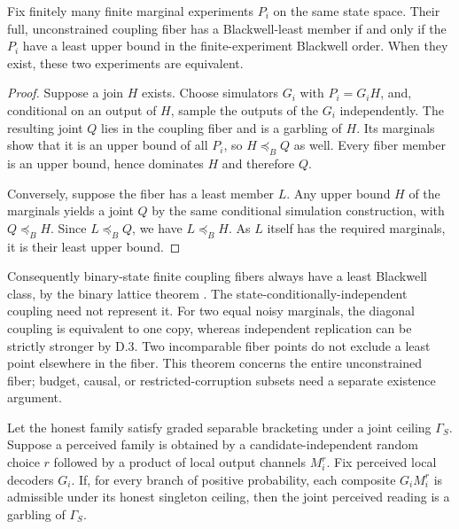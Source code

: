 
\begin{thmplain}

Fix finitely many finite marginal experiments \(P_i\) on the same state space. Their full, unconstrained coupling fiber has a Blackwell-least member if and only if the \(P_i\) have a least upper bound in the finite-experiment Blackwell order. When they exist, these two experiments are equivalent.
\end{thmplain}

\begin{proof}

Suppose a join \(H\) exists. Choose simulators \(G_i\) with \(P_i=G_iH\), and, conditional on an output of \(H\), sample the outputs of the \(G_i\) independently. The resulting joint \(Q\) lies in the coupling fiber and is a garbling of \(H\). Its marginals show that it is an upper bound of all \(P_i\), so \(H\preceq_B Q\) as well. Every fiber member is an upper bound, hence dominates \(H\) and therefore \(Q\).

Conversely, suppose the fiber has a least member \(L\). Any upper bound \(H\) of the marginals yields a joint \(Q\) by the same conditional simulation construction, with \(Q\preceq_B H\). Since \(L\preceq_B Q\), we have \(L\preceq_B H\). As \(L\) itself has the required marginals, it is their least upper bound.
\end{proof}

Consequently binary-state finite coupling fibers always have a least Blackwell class, by the binary lattice theorem \autocite{bertschinger2014}. The state-conditionally-independent coupling need not represent it. For two equal noisy marginals, the diagonal coupling is equivalent to one copy, whereas independent replication can be strictly stronger by D.3. Two incomparable fiber points do not exclude a least point elsewhere in the fiber. This theorem concerns the entire unconstrained fiber; budget, causal, or restricted-corruption subsets need a separate existence argument.


\begin{thmplain}

Let the honest family satisfy graded separable bracketing under a joint ceiling \(\Gamma_S\). Suppose a perceived family is obtained by a candidate-independent random choice \(r\) followed by a product of local output channels \(M_i^r\). Fix perceived local decoders \(G_i\). If, for every branch of positive probability, each composite \(G_iM_i^r\) is admissible under its honest singleton ceiling, then the joint perceived reading is a garbling of \(\Gamma_S\).
\end{thmplain}

